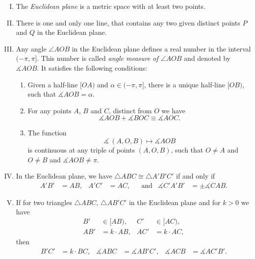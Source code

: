 \begin{framed}
\begin{enumerate}[I.]
\item\label{def:birkhoff-axioms:0} The \emph{Euclidean plane} is a metric space with at least two points.


\item\label{def:birkhoff-axioms:1} 
There is one and only one line, that contains any two given distinct points $P$ and $Q$ in the Euclidean plane.

\item\label{def:birkhoff-axioms:2} 
Any angle $\angle AOB$ in the Euclidean plane 
defines a real number in the interval $(-\pi,\pi]$.
This number is called \emph{angle measure of $\angle AOB$}
and denoted by $\measuredangle A O B$.
It satisfies the following conditions:
\begin{enumerate}
\item\label{def:birkhoff-axioms:2a} 
Given a half-line $[O A)$ and $\alpha\in(-\pi,\pi]$, 
there is a unique  half-line $[O B)$, 
such that $\measuredangle A O B= \alpha$.
\item\label{def:birkhoff-axioms:2b} 
For any points $A$, $B$ and $C$, distinct from $O$ we have
$$\measuredangle A O B+\measuredangle B O C
\equiv\measuredangle A O C.$$
\item\label{def:birkhoff-axioms:2c} 
The function 
$$\measuredangle\:(A,O,B)\mapsto\measuredangle A O B$$
is continuous at any triple of points $(A,O,B)$,
such that $O\ne A$ and $O\ne B$ and $\measuredangle A O B\ne\pi$.

\end{enumerate}

\item\label{def:birkhoff-axioms:3}  
In the Euclidean plane, we have
$\triangle A B C\cong\triangle A' B' C'$
if and only if 
\begin{align*}
A' B'&=A B, & A' C'&= A C, &&\text{and}
&\measuredangle C' A' B'&=\pm\measuredangle C A B.
\end{align*}
\item\label{def:birkhoff-axioms:4}
If for two triangles $\triangle ABC$, $\triangle AB'C'$ in the Euclidean plane
and for $k>0$ we have
\begin{align*}
B'&\in [AB),
& C'&\in [AC),
\\
AB'&=k\cdot AB,&
AC'&=k\cdot AC,
\end{align*}
then
\begin{align*}
B'C'&=k\cdot BC,&
\measuredangle ABC&=\measuredangle AB'C',
&
\measuredangle ACB&=\measuredangle AC'B'.
\end{align*}
\end{enumerate}
\end{framed}

